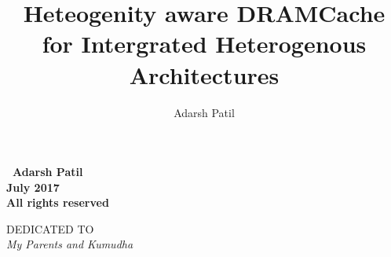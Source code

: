 \documentclass[oneside,12pt]{iiscmastersthesis}
\newcommand{\blankpage}{
\newpage
\thispagestyle{empty}
\mbox{}
\newpage
}
\begin{document}
\title{Heteogenity aware DRAMCache for Intergrated Heterogenous Architectures} 

\author{Adarsh Patil}



\maketitle

\newpage

\vspace*{\fill}
\begin{center}
\large\bf \textcopyright \ Adarsh Patil\\
\large\bf July 2017\\
\large\bf All rights reserved
\end{center}
\vspace*{\fill}
\thispagestyle{empty}

\newpage

\vspace*{\fill}
\begin{center}
DEDICATED TO \\[2em]
\Large\it My Parents and Kumudha
\end{center}
\vspace*{\fill}
\thispagestyle{empty}

\blankpage

\end{document}
